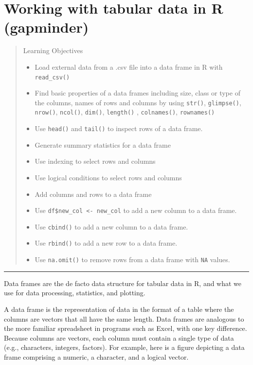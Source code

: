 \documentclass[
]{book}
\providecommand{\tightlist}{%
  \setlength{\itemsep}{0pt}\setlength{\parskip}{0pt}}
\begin{document}
\chapter{Working with tabular data in R (gapminder)}\label{data-gapminder}

\begin{quote}
Learning Objectives

\begin{itemize}
\tightlist
\item
  Load external data from a .csv file into a data frame in R with \texttt{read\_csv()}
\item
  Find basic properties of a data frames including size, class or type of the columns, names of rows and columns by using \texttt{str()}, \texttt{glimpse()}, \texttt{nrow()}, \texttt{ncol()}, \texttt{dim()}, \texttt{length()} , \texttt{colnames()}, \texttt{rownames()}
\item
  Use \texttt{head()} and \texttt{tail()} to inspect rows of a data frame.
\item
  Generate summary statistics for a data frame
\item
  Use indexing to select rows and columns
\item
  Use logical conditions to select rows and columns
\item
  Add columns and rows to a data frame
\item
  Use \texttt{df\$new\_col\ \textless{}-\ new\_col} to add a new column to a data frame.
\item
  Use \texttt{cbind()} to add a new column to a data frame.
\item
  Use \texttt{rbind()} to add a new row to a data frame.
\item
  Use \texttt{na.omit()} to remove rows from a data frame with \texttt{NA} values.
\end{itemize}
\end{quote}

\begin{center}\rule{0.5\linewidth}{0.5pt}\end{center}

Data frames are the de facto data structure for tabular data in R, and what we use for data processing, statistics, and plotting.

A data frame is the representation of data in the format of a table where the columns are vectors that all have the same length. Data frames are analogous to the more familiar spreadsheet in programs such as Excel, with one key difference. Because columns are vectors, each column must contain a single type of data (e.g., characters, integers, factors). For example, here is a figure depicting a data frame comprising a numeric, a character, and a logical vector.
\end{document}
